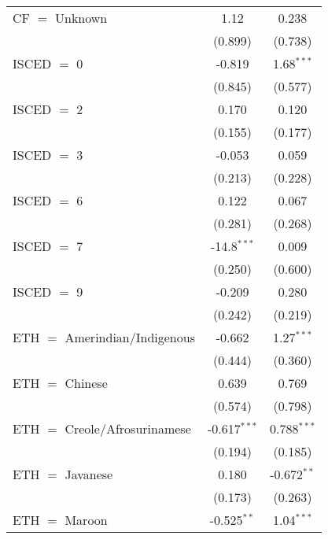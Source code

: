 \begin{table}[htbp!]
\begin{adjustbox}{width = 1\textwidth, max height = 0.95\textheight, center}
\begin{threeparttable}[b]
\begin{tabular}{lcc}
            CF $=$ Unknown                & 1.12           & 0.238\\   
                                          & (0.899)        & (0.738)\\   
            ISCED $=$ 0                   & -0.819         & 1.68$^{***}$\\   
                                          & (0.845)        & (0.577)\\   
            ISCED $=$ 2                   & 0.170          & 0.120\\   
                                          & (0.155)        & (0.177)\\   
            ISCED $=$ 3                   & -0.053         & 0.059\\   
                                          & (0.213)        & (0.228)\\   
            ISCED $=$ 6                   & 0.122          & 0.067\\   
                                          & (0.281)        & (0.268)\\   
            ISCED $=$ 7                   & -14.8$^{***}$  & 0.009\\   
                                          & (0.250)        & (0.600)\\   
            ISCED $=$ 9                   & -0.209         & 0.280\\   
                                          & (0.242)        & (0.219)\\   
            ETH $=$ Amerindian/Indigenous & -0.662         & 1.27$^{***}$\\   
                                          & (0.444)        & (0.360)\\   
            ETH $=$ Chinese               & 0.639          & 0.769\\   
                                          & (0.574)        & (0.798)\\   
            ETH $=$ Creole/Afrosurinamese & -0.617$^{***}$ & 0.788$^{***}$\\   
                                          & (0.194)        & (0.185)\\   
            ETH $=$ Javanese              & 0.180          & -0.672$^{**}$\\   
                                          & (0.173)        & (0.263)\\   
            ETH $=$ Maroon                & -0.525$^{**}$  & 1.04$^{***}$\\   

\end{tabular}
\end{threeparttable}
\end{adjustbox}
\end{table}
